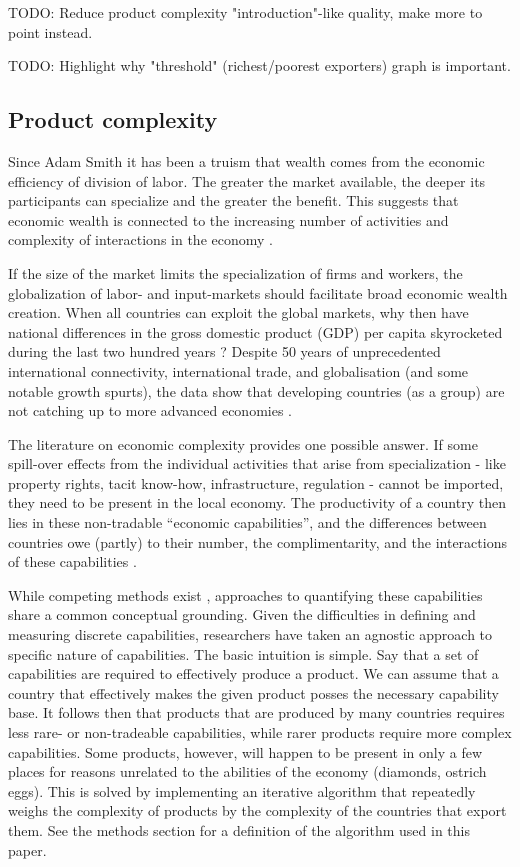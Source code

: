 \documentclass[11pt]{article}
\begin{document}
TODO: Reduce product complexity "introduction"-like quality, make more to point instead.

TODO: Highlight why "threshold" (richest/poorest exporters) graph is important.

\subsection{Product complexity}
\label{sec:frame-product-complexity}

Since Adam Smith it has been a truism that wealth comes from the economic efficiency of division of labor. The greater the market available, the deeper its participants can specialize and the greater the benefit. This suggests that economic wealth is connected to the increasing number of activities and complexity of interactions in the economy \citep{romer_endogenous_1990}.

If the size of the market limits the specialization of firms and workers, the globalization of labor- and input-markets should facilitate broad economic wealth creation. When all countries can exploit the global markets, why then have national differences in the gross domestic product (GDP) per capita skyrocketed during the last two hundred years \citep{pritchett_divergence_1997}? Despite 50 years of unprecedented international connectivity, international trade, and globalisation (and some notable growth spurts), the data show that developing countries (as a group) are not catching up to more advanced economies \citep{johnson_what_2020}.

The literature on economic complexity provides one possible answer. If some spill-over effects from the individual activities that arise from  specialization - like property rights, tacit know-how, infrastructure, regulation - cannot be imported, they need to be present in the local economy. The productivity of a country then lies in these non-tradable ``economic capabilities'', and the differences between countries owe (partly) to their number, the complimentarity, and the interactions of these capabilities \citep{hidalgo_product_2007,hausmann_atlas_2013}.

While competing methods exist \citep{tacchella_new_2012,hidalgo_building_2009,inoua_simple_2016}, approaches to quantifying these capabilities share a common conceptual grounding. Given the difficulties in defining and measuring discrete capabilities, researchers have taken an agnostic approach to specific nature of capabilities. The basic intuition is simple. Say that a set of capabilities are required to effectively produce a product. We can assume that a country that effectively makes the given product posses the necessary capability base. It follows then that products that are produced by many countries requires less rare- or non-tradeable capabilities, while rarer products require more complex capabilities. Some products, however, will happen to be present in only a few places for reasons unrelated to the abilities of the economy (diamonds, ostrich eggs). This is solved by implementing an iterative algorithm that repeatedly weighs the complexity of products by the complexity of the countries that export them. See the methods section for a definition of the algorithm used in this paper.
\end{document}
